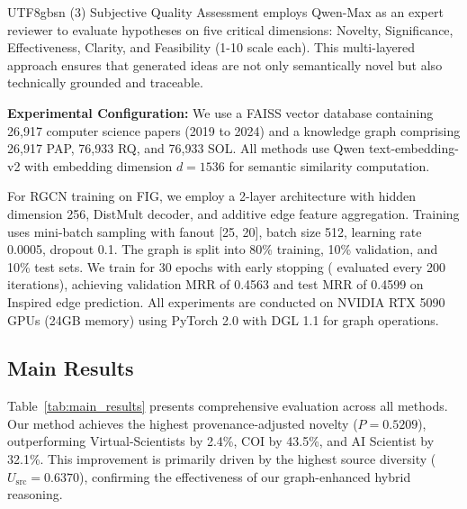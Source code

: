 \documentclass[11pt]{article}
\begin{document}
\begin{CJK}{UTF8}{gbsn}
(3) Subjective Quality Assessment employs Qwen-Max as an expert reviewer to evaluate hypotheses on five critical dimensions: Novelty, Significance, Effectiveness, Clarity, and Feasibility (1-10 scale each). This multi-layered approach ensures that generated ideas are not only semantically novel but also technically grounded and traceable.

\textbf{Experimental Configuration:}
We use a FAISS vector database containing 26,917 computer science papers (2019 to 2024) and a knowledge graph comprising 26,917 PAP, 76,933 RQ, and 76,933 SOL. All methods use Qwen text-embedding-v2 with embedding dimension $d=1536$ for semantic similarity computation.

For RGCN training on FIG, we employ a 2-layer architecture with hidden dimension 256, DistMult decoder, and additive edge feature aggregation. Training uses mini-batch sampling with fanout [25, 20], batch size 512, learning rate 0.0005, dropout 0.1. The graph is split into 80\% training, 10\% validation, and 10\% test sets. We train for 30 epochs with early stopping ( evaluated every 200 iterations), achieving validation MRR of 0.4563 and test MRR of 0.4599 on Inspired edge prediction. All experiments are conducted on NVIDIA RTX 5090 GPUs (24GB memory) using PyTorch 2.0 with DGL 1.1 for graph operations.


\subsection{Main Results}
\label{sec:main_results}
Table~\ref{tab:main_results} presents comprehensive evaluation across all methods. Our method achieves the highest provenance-adjusted novelty ($P = \mathbf{0.5209}$), outperforming Virtual-Scientists by 2.4\%, COI by 43.5\%, and AI Scientist by 32.1\%. This improvement is primarily driven by the highest source diversity ($U_{\text{src}} = \mathbf{0.6370}$), confirming the effectiveness of our graph-enhanced hybrid reasoning.



\end{CJK}
\end{document}
